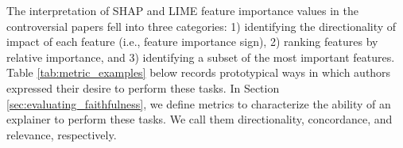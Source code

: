 \documentclass[mnsc,blindrev]{informs3}
\begin{document}
        The interpretation of SHAP and LIME feature importance values in the controversial papers fell into three categories: 1) identifying the directionality of impact of each feature (i.e., feature importance sign), 2) ranking features by relative importance, and 3) identifying a subset of the most important features. Table \ref{tab:metric_examples} below records prototypical ways in which authors expressed their desire to perform these tasks. In Section \ref{sec:evaluating_faithfulness}, we define metrics to characterize the ability of an explainer to perform these tasks. We call them directionality, concordance, and relevance, respectively. 

\end{document}
